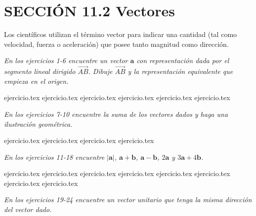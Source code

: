 
\section*{SECCIÓN 11.2 \quad Vectores}

Los científicos utilizan el término vector para indicar una cantidad (tal como velocidad, fuerza o aceleración) que posee tanto magnitud como dirección.

\vspace{0.5cm}
\noindent\textit{En los ejercicios 1-6 encuentre un vector $\mathbf{a}$ con representación dada por el segmento lineal dirigido $\overrightarrow{AB}$. Dibuje $\overrightarrow{AB}$ y la representación equivalente que empieza en el origen.}

\begin{enumerate}
    {ejercicio.tex}
{ejercicio.tex}
{ejercicio.tex}
{ejercicio.tex}
{ejercicio.tex}
{ejercicio.tex}
\end{enumerate}

\vspace{0.3cm}
\noindent\textit{En los ejercicios 7-10 encuentre la suma de los vectores dados y haga una ilustración geométrica.}

\begin{enumerate}
    \setcounter{enumi}{6}
    {ejercicio.tex}
{ejercicio.tex}
{ejercicio.tex}
{ejercicio.tex}
\end{enumerate}

\vspace{0.3cm}
\noindent\textit{En los ejercicios 11-18 encuentre $|\mathbf{a}|$, $\mathbf{a} + \mathbf{b}$, $\mathbf{a} - \mathbf{b}$, $2\mathbf{a}$ y $3\mathbf{a} + 4\mathbf{b}$.}

\begin{enumerate}
    \setcounter{enumi}{10}
    {ejercicio.tex}
{ejercicio.tex}
{ejercicio.tex}
{ejercicio.tex}
{ejercicio.tex}
{ejercicio.tex}
{ejercicio.tex}
{ejercicio.tex}
\end{enumerate}

\vspace{0.3cm}
\noindent\textit{En los ejercicios 19-24 encuentre un vector unitario que tenga la misma dirección del vector dado.}

